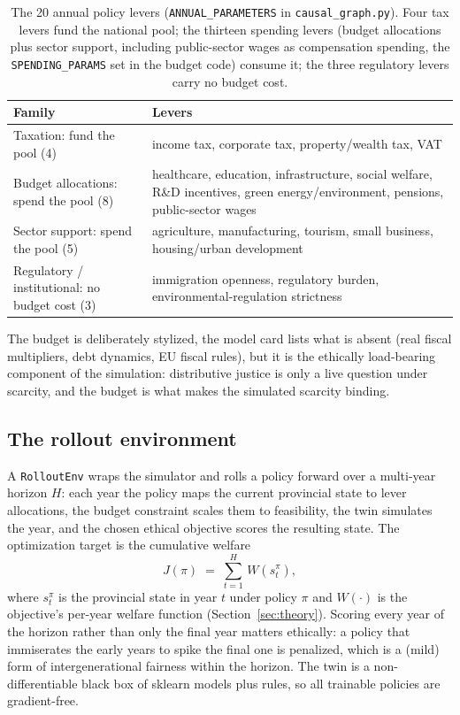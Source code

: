 \documentclass[11pt,a4paper]{article}
\newcommand{\code}[1]{\texttt{#1}}
\begin{document}
\begin{table}[ht]
\centering
\small
\begin{tabular}{@{}L{5.3cm}L{10.1cm}@{}}
\toprule
\textbf{Family} & \textbf{Levers} \\
\midrule
Taxation: fund the pool (4) & income tax, corporate tax, property/wealth tax, VAT \\
\addlinespace
Budget allocations: spend the pool (8) & healthcare, education, infrastructure, social welfare, R\&D incentives, green energy/environment, pensions, public-sector wages \\
\addlinespace
Sector support: spend the pool (5) & agriculture, manufacturing, tourism, small business, housing/urban development \\
\addlinespace
Regulatory / institutional: no budget cost (3) & immigration openness, regulatory burden, environmental-regulation strictness \\
\bottomrule
\end{tabular}
\caption{The 20 annual policy levers (\code{ANNUAL\_PARAMETERS} in
\code{causal\_graph.py}). Four tax levers fund the national pool; the thirteen
spending levers (budget allocations plus sector support, including
public-sector wages as compensation spending, the \code{SPENDING\_PARAMS}
set in the budget code) consume it; the three regulatory levers carry no
budget cost.}
\label{tab:levers}
\end{table}

The budget is deliberately stylized, the model card lists what is absent
(real fiscal multipliers, debt dynamics, EU fiscal rules), but it is the
ethically load-bearing component of the simulation: distributive justice is
only a live question under scarcity, and the budget is what makes the
simulated scarcity binding.

\subsection{The rollout environment}

A \code{RolloutEnv} wraps the simulator and rolls a policy forward over a
multi-year horizon $H$: each year the policy maps the current provincial state
to lever allocations, the budget constraint scales them to feasibility, the
twin simulates the year, and the chosen ethical objective scores the resulting
state. The optimization target is the cumulative welfare
\begin{equation}
    J(\pi) \;=\; \sum_{t=1}^{H} \, W\!\left(s_t^{\pi}\right),
    \label{eq:cumwelfare}
\end{equation}
where $s_t^{\pi}$ is the provincial state in year $t$ under policy $\pi$ and
$W(\cdot)$ is the objective's per-year welfare function
(Section~\ref{sec:theory}). Scoring every year of the horizon rather than only
the final year matters ethically: a policy that immiserates the early years to
spike the final one is penalized, which is a (mild) form of intergenerational
fairness within the horizon. The twin is a non-differentiable black box of
sklearn models plus rules, so all trainable policies are gradient-free.
\end{document}
